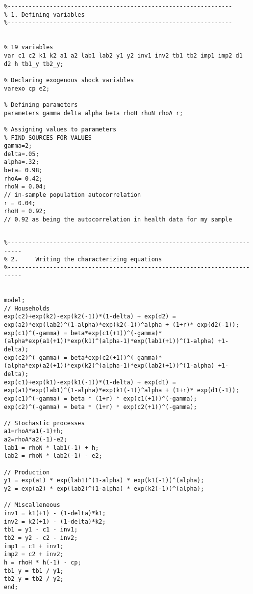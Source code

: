 \documentclass{article}
\begin{document}
\newsavebox\myv
\begin{lrbox}{\myv}\begin{minipage}{\textwidth}
\begin{verbatim}
%----------------------------------------------------------------
% 1. Defining variables
%----------------------------------------------------------------


% 19 variables
var c1 c2 k1 k2 a1 a2 lab1 lab2 y1 y2 inv1 inv2 tb1 tb2 imp1 imp2 d1 d2 h tb1_y tb2_y;

% Declaring exogenous shock variables
varexo cp e2;

% Defining parameters
parameters gamma delta alpha beta rhoH rhoN rhoA r;

% Assigning values to parameters
% FIND SOURCES FOR VALUES
gamma=2;
delta=.05;
alpha=.32;
beta= 0.98;
rhoA= 0.42;
rhoN = 0.04;
// in-sample population autocorrelation
r = 0.04;
rhoH = 0.92;
// 0.92 as being the autocorrelation in health data for my sample

\end{verbatim}
\end{minipage}\end{lrbox}
\resizebox{0.95\textwidth}{!}{\usebox\myv}

\begin{lrbox}{\myv}\begin{minipage}{\textwidth}
\begin{verbatim}

%--------------------------------------------------------------------------
% 2.     Writing the characterizing equations  
%--------------------------------------------------------------------------


model;
// Households
exp(c2)+exp(k2)-exp(k2(-1))*(1-delta) + exp(d2) = exp(a2)*exp(lab2)^(1-alpha)*exp(k2(-1))^alpha + (1+r)* exp(d2(-1));
exp(c1)^(-gamma) = beta*exp(c1(+1))^(-gamma)*(alpha*exp(a1(+1))*exp(k1)^(alpha-1)*exp(lab1(+1))^(1-alpha) +1-delta);
exp(c2)^(-gamma) = beta*exp(c2(+1))^(-gamma)*(alpha*exp(a2(+1))*exp(k2)^(alpha-1)*exp(lab2(+1))^(1-alpha) +1-delta);
exp(c1)+exp(k1)-exp(k1(-1))*(1-delta) + exp(d1) = exp(a1)*exp(lab1)^(1-alpha)*exp(k1(-1))^alpha + (1+r)* exp(d1(-1));
exp(c1)^(-gamma) = beta * (1+r) * exp(c1(+1))^(-gamma);
exp(c2)^(-gamma) = beta * (1+r) * exp(c2(+1))^(-gamma);

// Stochastic processes
a1=rhoA*a1(-1)+h;
a2=rhoA*a2(-1)-e2;
lab1 = rhoN * lab1(-1) + h;
lab2 = rhoN * lab2(-1) - e2;

// Production
y1 = exp(a1) * exp(lab1)^(1-alpha) * exp(k1(-1))^(alpha);
y2 = exp(a2) * exp(lab2)^(1-alpha) * exp(k2(-1))^(alpha);

// Miscalleneous
inv1 = k1(+1) - (1-delta)*k1;
inv2 = k2(+1) - (1-delta)*k2;
tb1 = y1 - c1 - inv1;
tb2 = y2 - c2 - inv2;
imp1 = c1 + inv1;
imp2 = c2 + inv2;
h = rhoH * h(-1) - cp;
tb1_y = tb1 / y1;
tb2_y = tb2 / y2;
end;

\end{verbatim}
\end{minipage}\end{lrbox}
\resizebox{0.75\textwidth}{!}{\usebox\myv}
\end{document}
